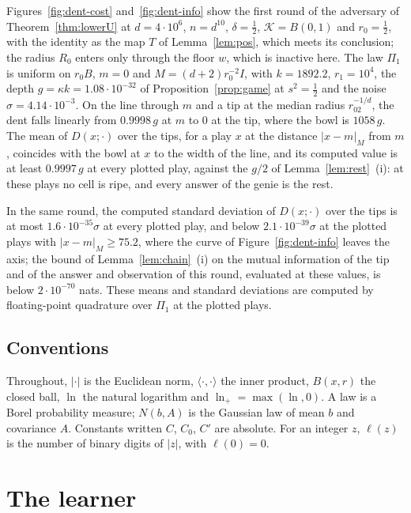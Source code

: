\documentclass[11pt]{amsart}
\theoremstyle{definition}
\numberwithin{equation}{section}
\newcommand{\cK}{\mathcal{K}}
\newcommand{\ip}[1]{\langle #1\rangle}
\newcommand{\lnp}{\ln_{+}}
\begin{document}
Figures~\ref{fig:dent-cost} and~\ref{fig:dent-info} show the first round of the adversary of Theorem~\ref{thm:lowerU} at $d=4\cdot10^6$, $n=d^{10}$, $\delta=\frac12$, $\cK=B(0,1)$ and $r_0=\frac12$, with the identity as the map $T$ of Lemma~\ref{lem:pos}, which meets its conclusion; the radius $R_0$ enters only through the floor $w$, which is inactive here. The law $\Pi_1$ is uniform on $r_0B$, $m=0$ and $M=(d+2)r_0^{-2}I$, with $k=1892.2$, $r_1=10^4$, the depth $g=\kappa k=1.08\cdot10^{-32}$ of Proposition~\ref{prop:game} at $s^2=\frac12$ and the noise $\sigma=4.14\cdot10^{-3}$. On the line through $m$ and a tip at the median radius $r_02^{-1/d}$, the dent falls linearly from $0.9998\,g$ at $m$ to $0$ at the tip, where the bowl is $1058\,g$. The mean of $D(x;\cdot)$ over the tips, for a play $x$ at the distance $|x-m|_M$ from $m$, coincides with the bowl at $x$ to the width of the line, and its computed value is at least $0.9997\,g$ at every plotted play, against the $g/2$ of Lemma~\ref{lem:rest}~(i): at these plays no cell is ripe, and every answer of the genie is the rest.

In the same round, the computed standard deviation of $D(x;\cdot)$ over the tips is at most $1.6\cdot10^{-35}\sigma$ at every plotted play, and below $2.1\cdot10^{-39}\sigma$ at the plotted plays with $|x-m|_M\ge75.2$, where the curve of Figure~\ref{fig:dent-info} leaves the axis; the bound of Lemma~\ref{lem:chain}~(i) on the mutual information of the tip and of the answer and observation of this round, evaluated at these values, is below $2\cdot10^{-70}$ nats. These means and standard deviations are computed by floating-point quadrature over $\Pi_1$ at the plotted plays.

\subsection{Conventions}

Throughout, $|\cdot|$ is the Euclidean norm, $\ip{\cdot,\cdot}$ the inner product, $B(x,r)$ the closed ball, $\ln$ the natural logarithm and $\lnp=\max(\ln,0)$. A law is a Borel probability measure; $N(b,A)$ is the Gaussian law of mean $b$ and covariance $A$. Constants written $C$, $C_0$, $C'$ are absolute. For an integer $z$, $\ell(z)$ is the number of binary digits of $|z|$, with $\ell(0)=0$.

\section{The learner}\label{sec:poly}
\end{document}
